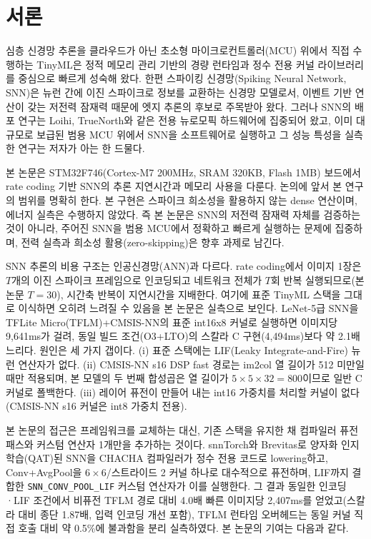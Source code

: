 \section{서론}\label{sec:intro}

심층 신경망 추론을 클라우드가 아닌 초소형 마이크로컨트롤러(MCU) 위에서 직접 수행하는 TinyML은 정적 메모리 관리 기반의 경량 런타임과 정수 전용 커널 라이브러리를 중심으로 빠르게 성숙해 왔다\cite{david2021tflm,lai2018cmsisnn,lin2020mcunet}. 한편 스파이킹 신경망(Spiking Neural Network, SNN)은 뉴런 간에 이진 스파이크로 정보를 교환하는 신경망 모델로서\cite{maass1997networks}, 이벤트 기반 연산이 갖는 저전력 잠재력 때문에 엣지 추론의 후보로 주목받아 왔다\cite{roy2019towards}. 그러나 SNN의 배포 연구는 Loihi, TrueNorth와 같은 전용 뉴로모픽 하드웨어에 집중되어 왔고\cite{davies2018loihi,merolla2014truenorth}, 이미 대규모로 보급된 범용 MCU 위에서 SNN을 소프트웨어로 실행하고 그 성능 특성을 실측한 연구는 저자가 아는 한 드물다.

본 논문은 STM32F746(Cortex-M7 200MHz, SRAM 320KB, Flash 1MB) 보드에서 rate coding 기반 SNN의 추론 지연시간과 메모리 사용을 다룬다. 논의에 앞서 본 연구의 범위를 명확히 한다. 본 구현은 스파이크 희소성을 활용하지 않는 dense 연산이며, 에너지 실측은 수행하지 않았다. 즉 본 논문은 SNN의 저전력 잠재력 자체를 검증하는 것이 아니라, 주어진 SNN을 범용 MCU에서 정확하고 빠르게 실행하는 문제에 집중하며, 전력 실측과 희소성 활용(zero-skipping)은 향후 과제로 남긴다.

SNN 추론의 비용 구조는 인공신경망(ANN)과 다르다. rate coding에서 이미지 1장은 $T$개의 이진 스파이크 프레임으로 인코딩되고 네트워크 전체가 $T$회 반복 실행되므로(본 논문 $T{=}30$), 시간축 반복이 지연시간을 지배한다. 여기에 표준 TinyML 스택을 그대로 이식하면 오히려 느려질 수 있음을 본 논문은 실측으로 보인다. LeNet-5급 SNN을 TFLite Micro(TFLM)+CMSIS-NN의 표준 int16x8 커널로 실행하면 이미지당 9,641ms가 걸려, 동일 빌드 조건(O3+LTO)의 스칼라 C 구현(4,494ms)보다 약 2.1배 느리다. 원인은 세 가지 갭이다. (i) 표준 스택에는 LIF(Leaky Integrate-and-Fire) 뉴런 연산자가 없다. (ii) CMSIS-NN s16 DSP fast 경로는 im2col 열 길이가 512 미만일 때만 적용되며, 본 모델의 두 번째 합성곱은 열 길이가 $5\times5\times32=800$이므로 일반 C 커널로 폴백한다. (iii) 레이어 퓨전이 만들어 내는 int16 가중치를 처리할 커널이 없다(CMSIS-NN s16 커널은 int8 가중치 전용).

본 논문의 접근은 프레임워크를 교체하는 대신, 기존 스택을 유지한 채 컴파일러 퓨전 패스와 커스텀 연산자 1개만을 추가하는 것이다. snnTorch와 Brevitas로 양자화 인지 학습(QAT)된 SNN을 CHACHA 컴파일러가 정수 전용 코드로 lowering하고, Conv+AvgPool을 $6\times6$/스트라이드 2 커널 하나로 대수적으로 퓨전하며, LIF까지 결합한 \texttt{SNN\_CONV\_POOL\_LIF} 커스텀 연산자가 이를 실행한다. 그 결과 동일한 인코딩·LIF 조건에서 비퓨전 TFLM 경로 대비 4.0배 빠른 이미지당 2,407ms를 얻었고(스칼라 대비 종단 1.87배, 입력 인코딩 개선 포함), TFLM 런타임 오버헤드는 동일 커널 직접 호출 대비 약 0.5\%에 불과함을 분리 실측하였다. 본 논문의 기여는 다음과 같다.

